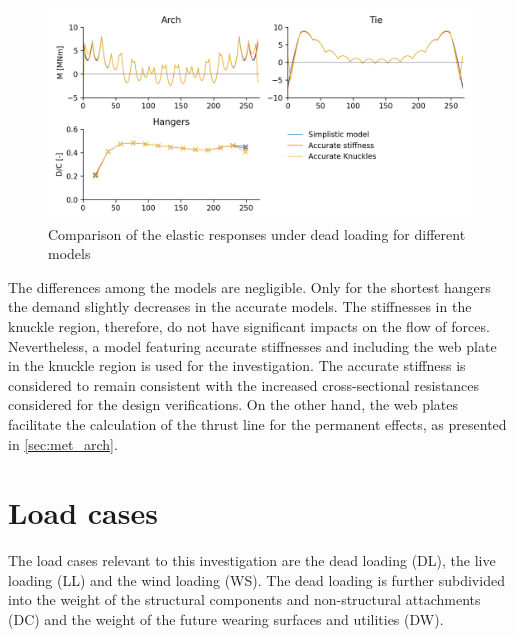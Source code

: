 \begin{figure}[H]
    \centering
    \includegraphics[width=\textwidth]{calculations/model comparison/dead_loading.png}
    \caption{Comparison of the elastic responses under dead loading for different models}
    \label{fig:model_comparison}
\end{figure}

The differences among the models are negligible. Only for the shortest hangers the demand slightly decreases in the accurate models. The stiffnesses in the knuckle region, therefore, do not have significant impacts on the flow of forces. Nevertheless, a model featuring accurate stiffnesses and including the web plate in the knuckle region is used for the investigation. The accurate stiffness is considered to remain consistent with the increased cross-sectional resistances considered for the design verifications. On the other hand, the web plates facilitate the calculation of the thrust line for the permanent effects, as presented in \cref{sec:met_arch}.

\newpage
\section{Load cases} \label{sec:met_loads}
The load cases relevant to this investigation are the dead loading (DL), the live loading (LL) and the wind loading (WS). The dead loading is further subdivided into the weight of the structural components and non-structural attachments (DC) and the weight of the future wearing surfaces and utilities (DW).

